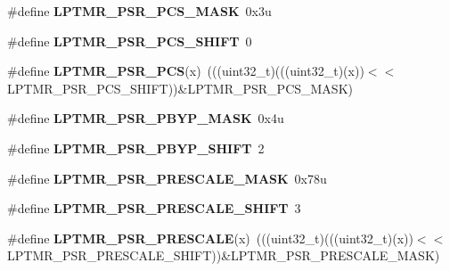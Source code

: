 \begin{DoxyCompactItemize}
\item 
\#define {\bfseries L\+P\+T\+M\+R\+\_\+\+P\+S\+R\+\_\+\+P\+C\+S\+\_\+\+M\+A\+SK}~0x3u\hypertarget{group__LPTMR__Register__Masks_ga40daa10db43ec0c0a1944e6289ca29cc}{}\label{group__LPTMR__Register__Masks_ga40daa10db43ec0c0a1944e6289ca29cc}

\item 
\#define {\bfseries L\+P\+T\+M\+R\+\_\+\+P\+S\+R\+\_\+\+P\+C\+S\+\_\+\+S\+H\+I\+FT}~0\hypertarget{group__LPTMR__Register__Masks_gaf258bce874ad60601d6d76cefc72c52e}{}\label{group__LPTMR__Register__Masks_gaf258bce874ad60601d6d76cefc72c52e}

\item 
\#define {\bfseries L\+P\+T\+M\+R\+\_\+\+P\+S\+R\+\_\+\+P\+CS}(x)~(((uint32\+\_\+t)(((uint32\+\_\+t)(x))$<$$<$L\+P\+T\+M\+R\+\_\+\+P\+S\+R\+\_\+\+P\+C\+S\+\_\+\+S\+H\+I\+FT))\&L\+P\+T\+M\+R\+\_\+\+P\+S\+R\+\_\+\+P\+C\+S\+\_\+\+M\+A\+SK)\hypertarget{group__LPTMR__Register__Masks_gabeba0b705770f53c56a569a5ee74536b}{}\label{group__LPTMR__Register__Masks_gabeba0b705770f53c56a569a5ee74536b}

\item 
\#define {\bfseries L\+P\+T\+M\+R\+\_\+\+P\+S\+R\+\_\+\+P\+B\+Y\+P\+\_\+\+M\+A\+SK}~0x4u\hypertarget{group__LPTMR__Register__Masks_gab3daae6085cf702b31db5be78fe03872}{}\label{group__LPTMR__Register__Masks_gab3daae6085cf702b31db5be78fe03872}

\item 
\#define {\bfseries L\+P\+T\+M\+R\+\_\+\+P\+S\+R\+\_\+\+P\+B\+Y\+P\+\_\+\+S\+H\+I\+FT}~2\hypertarget{group__LPTMR__Register__Masks_ga4bb5021e396db697f5e597fdcdc222e3}{}\label{group__LPTMR__Register__Masks_ga4bb5021e396db697f5e597fdcdc222e3}

\item 
\#define {\bfseries L\+P\+T\+M\+R\+\_\+\+P\+S\+R\+\_\+\+P\+R\+E\+S\+C\+A\+L\+E\+\_\+\+M\+A\+SK}~0x78u\hypertarget{group__LPTMR__Register__Masks_ga93a6fe3fb169a73716a837cedb92dbef}{}\label{group__LPTMR__Register__Masks_ga93a6fe3fb169a73716a837cedb92dbef}

\item 
\#define {\bfseries L\+P\+T\+M\+R\+\_\+\+P\+S\+R\+\_\+\+P\+R\+E\+S\+C\+A\+L\+E\+\_\+\+S\+H\+I\+FT}~3\hypertarget{group__LPTMR__Register__Masks_ga7ed76902e13634d0c543ade3ef47525a}{}\label{group__LPTMR__Register__Masks_ga7ed76902e13634d0c543ade3ef47525a}

\item 
\#define {\bfseries L\+P\+T\+M\+R\+\_\+\+P\+S\+R\+\_\+\+P\+R\+E\+S\+C\+A\+LE}(x)~(((uint32\+\_\+t)(((uint32\+\_\+t)(x))$<$$<$L\+P\+T\+M\+R\+\_\+\+P\+S\+R\+\_\+\+P\+R\+E\+S\+C\+A\+L\+E\+\_\+\+S\+H\+I\+FT))\&L\+P\+T\+M\+R\+\_\+\+P\+S\+R\+\_\+\+P\+R\+E\+S\+C\+A\+L\+E\+\_\+\+M\+A\+SK)\hypertarget{group__LPTMR__Register__Masks_ga37d8f4b0de3a75590548d8f3b6686b95}{}\label{group__LPTMR__Register__Masks_ga37d8f4b0de3a75590548d8f3b6686b95}


\end{DoxyCompactItemize}
